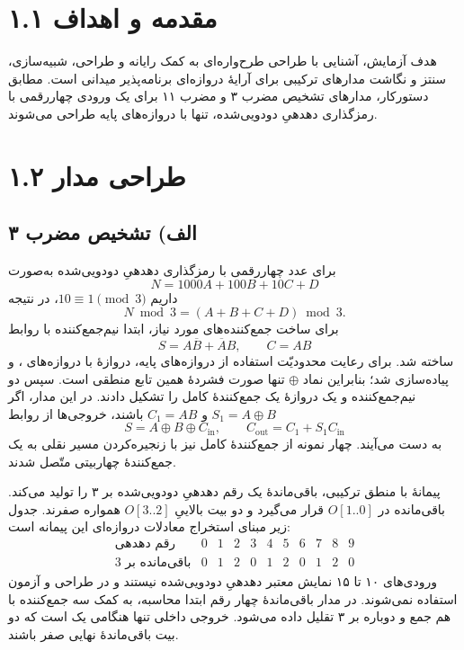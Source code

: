 \documentclass[12pt,a4paper]{article}
\begin{document}

	\section*{۱.۱ مقدمه و اهداف}
	هدف آزمایش، آشنایی با طراحی طرح‌واره‌ای به کمک رایانه و طراحی، شبیه‌سازی، سنتز و نگاشت مدارهای ترکیبی برای آرایهٔ دروازه‌ای برنامه‌پذیر میدانی است. مطابق دستورکار، مدارهای تشخیص مضرب ۳ و مضرب ۱۱ برای یک ورودی چهاررقمی با رمزگذاری دهدهیِ دودویی‌شده، تنها با دروازه‌های پایه طراحی می‌شوند.

	\section*{۱.۲ طراحی مدار}
	\subsection*{الف) تشخیص مضرب ۳}
	برای عدد چهاررقمی با رمزگذاری دهدهیِ دودویی‌شده به‌صورت
	\[
		N=1000A+100B+10C+D
	\]
	داریم \(10\equiv1\pmod 3\)، در نتیجه
	\[
		N\bmod3=(A+B+C+D)\bmod3.
	\]
	برای ساخت جمع‌کننده‌های مورد نیاز، ابتدا نیم‌جمع‌کننده با روابط
	\[
		S=A\overline{B}+\overline{A}B,\qquad C=AB
	\]
	ساخته شد. برای رعایت محدودیّت استفاده از دروازه‌های پایه، دروازهٔ  با دروازه‌های ،  و  پیاده‌سازی شد؛ بنابراین نماد \(\oplus\) تنها صورت فشردهٔ همین تابع منطقی است. سپس دو نیم‌جمع‌کننده و یک دروازهٔ  یک جمع‌کنندهٔ کامل را تشکیل دادند. در این مدار، اگر \(S_1=A\oplus B\) و \(C_1=AB\) باشند، خروجی‌ها از روابط
	\[
		S=A\oplus B\oplus C_{\mathrm{in}},\qquad
		C_{\mathrm{out}}=C_1+S_1C_{\mathrm{in}}
	\]
	به دست می‌آیند. چهار نمونه از جمع‌کنندهٔ کامل نیز با زنجیره‌کردن مسیر نقلی به یک جمع‌کنندهٔ چهاربیتی متّصل شدند.


	پیمانهٔ  با منطق ترکیبی، باقی‌ماندهٔ یک رقم دهدهیِ دودویی‌شده بر ۳ را تولید می‌کند. باقی‌مانده در \(O[1..0]\) قرار می‌گیرد و دو بیت بالاییِ \(O[3..2]\) همواره صفرند. جدول زیر مبنای استخراج معادلات دروازه‌ای این پیمانه است:
	\[
	\begin{array}{c|cccccccccc}
	\text{رقم دهدهی} & 0&1&2&3&4&5&6&7&8&9\\ \hline
	\text{باقی‌مانده بر 3} & 0&1&2&0&1&2&0&1&2&0
	\end{array}
	\]
	ورودی‌های ۱۰ تا ۱۵ نمایش معتبر دهدهیِ دودویی‌شده نیستند و در طراحی و آزمون استفاده نمی‌شوند. در مدار  باقی‌ماندهٔ چهار رقم ابتدا محاسبه، به کمک سه جمع‌کننده با هم جمع و دوباره بر ۳ تقلیل داده می‌شود. خروجی داخلی  تنها هنگامی یک است که دو بیت باقی‌ماندهٔ نهایی صفر باشند.
\end{document}
